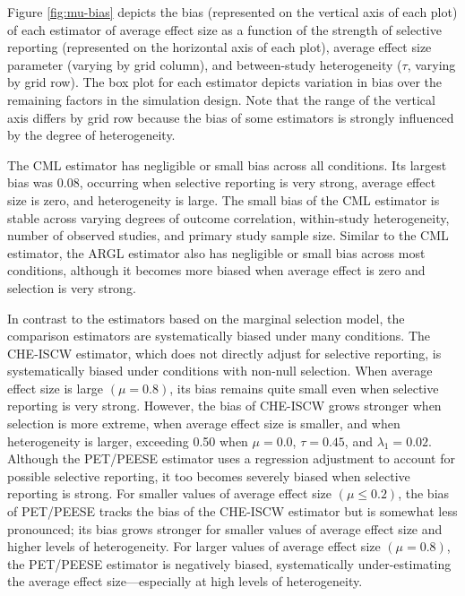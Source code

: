 \documentclass[
  american,
  man, donotrepeattitle,floatsintext]{apa7}
\begin{document}
Figure \ref{fig:mu-bias} depicts the bias (represented on the vertical axis of each plot) of each estimator of average effect size as a function of the strength of selective reporting (represented on the horizontal axis of each plot), average effect size parameter (varying by grid column), and between-study heterogeneity (\(\tau\), varying by grid row).
The box plot for each estimator depicts variation in bias over the remaining factors in the simulation design.
Note that the range of the vertical axis differs by grid row because the bias of some estimators is strongly influenced by the degree of heterogeneity.

The CML estimator has negligible or small bias across all conditions.
Its largest bias was 0.08, occurring when selective reporting is very strong, average effect size is zero, and heterogeneity is large.
The small bias of the CML estimator is stable across varying degrees of outcome correlation, within-study heterogeneity, number of observed studies, and primary study sample size.
Similar to the CML estimator, the ARGL estimator also has negligible or small bias across most conditions, although it becomes more biased when average effect is zero and selection is very strong.

In contrast to the estimators based on the marginal selection model, the comparison estimators are systematically biased under many conditions.
The CHE-ISCW estimator, which does not directly adjust for selective reporting, is systematically biased under conditions with non-null selection.
When average effect size is large \((\mu = 0.8)\), its bias remains quite small even when selective reporting is very strong.
However, the bias of CHE-ISCW grows stronger when selection is more extreme, when average effect size is smaller, and when heterogeneity is larger, exceeding 0.50 when \(\mu = 0.0\), \(\tau = 0.45\), and \(\lambda_1 = 0.02\).
Although the PET/PEESE estimator uses a regression adjustment to account for possible selective reporting, it too becomes severely biased when selective reporting is strong.
For smaller values of average effect size \((\mu \leq 0.2)\), the bias of PET/PEESE tracks the bias of the CHE-ISCW estimator but is somewhat less pronounced; its bias grows stronger for smaller values of average effect size and higher levels of heterogeneity.
For larger values of average effect size \((\mu = 0.8)\), the PET/PEESE estimator is negatively biased, systematically under-estimating the average effect size---especially at high levels of heterogeneity.
\end{document}
